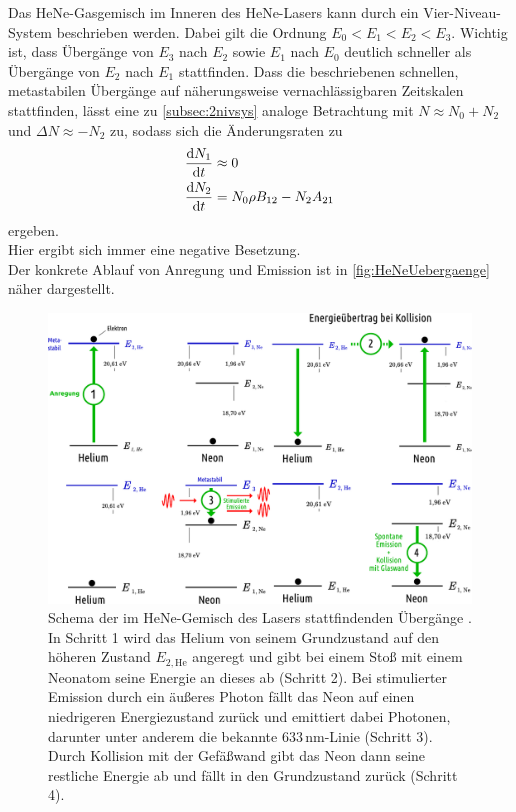 Das HeNe-Gasgemisch im Inneren des HeNe-Lasers kann durch ein Vier-Niveau-System beschrieben werden.
Dabei gilt die Ordnung $E_0 < E_1 < E_2 < E_3$. Wichtig ist, dass Übergänge von $E_3$ nach $E_2$ sowie $E_1$ nach $E_0$ deutlich schneller als Übergänge von $E_2$ nach $E_1$ stattfinden.
Dass die beschriebenen schnellen, metastabilen Übergänge auf näherungsweise vernachlässigbaren Zeitskalen stattfinden, lässt eine zu \autoref{subsec:2nivsys} analoge Betrachtung mit
$N \approx N_0 + N_2$ und $\Delta N \approx - N_2$ zu, sodass sich die Änderungsraten zu
\begin{align*}
    \frac{\mathrm{d} N_1}{\mathrm{d} t} &\approx 0 \\
    \frac{\mathrm{d} N_2}{\mathrm{d} t} &= N_0 \rho B_{12} - N_2 A_{21}
\end{align*}
ergeben. \\
Hier ergibt sich immer eine negative Besetzung. \\

Der konkrete Ablauf von Anregung und Emission ist in \autoref{fig:HeNeUebergaenge} näher dargestellt.

\begin{figure}[H]
    \centering
    \includegraphics[width=\textwidth]{figures/HeNe-LaserÜbergänge.pdf}
    \caption{Schema der im HeNe-Gemisch des Lasers stattfindenden Übergänge \cite{leifi}. In Schritt 1 wird das Helium von seinem Grundzustand auf den höheren Zustand $E_{2,\text{He}}$ angeregt und gibt bei einem Stoß
    mit einem Neonatom seine Energie an dieses ab (Schritt 2). Bei stimulierter Emission durch ein äußeres Photon fällt das Neon auf einen niedrigeren Energiezustand zurück und emittiert dabei Photonen, darunter unter
    anderem die bekannte $633 \,\unit{\nano\meter}$-Linie (Schritt 3). Durch Kollision mit der Gefäßwand gibt das Neon dann seine restliche Energie ab und fällt in den Grundzustand zurück (Schritt 4).}
    \label{fig:HeNeUebergaenge}
\end{figure}


